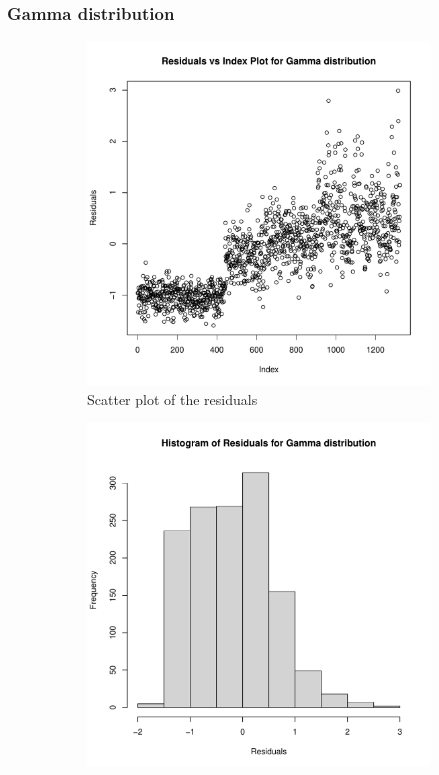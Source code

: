 \documentclass[12pt,a4paper,twoside]{article}
\begin{document}
\subsubsection{Gamma distribution}
\label{sssec:gamma}
\begin{figure}[!ht]
    \begin{subfigure}{.45\textwidth}
        \centering
        \includegraphics[width=\linewidth]{img/Gamma_distribution_20x20.pdf}
        \caption{Scatter plot of the residuals}
        \label{fig:gammascatter20}
    \end{subfigure}
    \begin{subfigure}{.45\textwidth}
        \centering
        \includegraphics[width=\linewidth]{img/Gamma_distribution_histogram_20x20.pdf}

\end{subfigure}
\end{figure}
\end{document}
